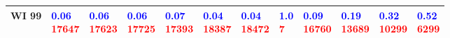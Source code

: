 \begin{tabular}{llllllllllll}
WI 99  &  \makecell{\textcolor{blue}{0.06} \\ \textcolor{red}{17647}} &  \makecell{\textcolor{blue}{0.06} \\ \textcolor{red}{17623}} &  \makecell{\textcolor{blue}{0.06} \\ \textcolor{red}{17725}} &  \makecell{\textcolor{blue}{0.07} \\ \textcolor{red}{17393}} &  \makecell{\textcolor{blue}{0.04} \\ \textcolor{red}{18387}} &  \makecell{\textcolor{blue}{0.04} \\ \textcolor{red}{18472}} &     \makecell{\textcolor{blue}{1.0} \\ \textcolor{red}{7}} &  \makecell{\textcolor{blue}{0.09} \\ \textcolor{red}{16760}} &  \makecell{\textcolor{blue}{0.19} \\ \textcolor{red}{13689}} &  \makecell{\textcolor{blue}{0.32} \\ \textcolor{red}{10299}} &   \makecell{\textcolor{blue}{0.52} \\ \textcolor{red}{6299}} \\
\bottomrule
\end{tabular}
